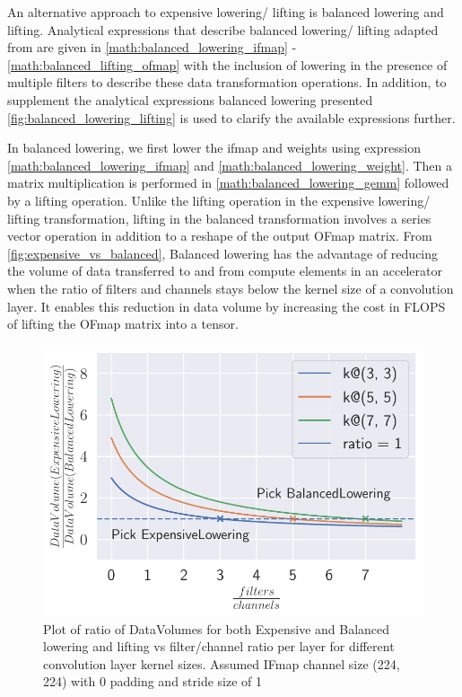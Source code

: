 An alternative approach to expensive lowering/ lifting is balanced lowering and
lifting. Analytical expressions that describe balanced lowering/ lifting adapted
from \cite{cafe_con_troll} are given in \eqref{math:balanced_lowering_ifmap} -
\eqref{math:balanced_lifting_ofmap} with the inclusion of lowering in the
presence of multiple filters to describe these data transformation operations.
In addition, to supplement the analytical expressions balanced lowering
presented \autoref{fig:balanced_lowering_lifting} is used to clarify the
available expressions further.  

In balanced lowering, we first lower the ifmap and weights using expression
\eqref{math:balanced_lowering_ifmap} and \eqref{math:balanced_lowering_weight}.
Then a matrix multiplication is performed in \eqref{math:balanced_lowering_gemm}
followed by a lifting operation. Unlike the lifting operation in the expensive
lowering/ lifting transformation, lifting in the balanced transformation
involves a series vector operation in addition to a reshape of the output OFmap
matrix. From \autoref{fig:expensive_vs_balanced}, Balanced lowering has the
advantage of reducing the volume of data transferred to and from compute
elements in an accelerator when the ratio of filters and channels stays below
the kernel size of a convolution layer. It enables this reduction in data volume
by increasing the cost in FLOPS of lifting the OFmap matrix into a tensor. 

\begin{figure}[!ht]
    \centering
    \includegraphics[scale=0.8]{Plots/kernel/BalancedVExpensive.pdf}
    \caption{Plot of ratio of DataVolumes for both Expensive and Balanced lowering and lifting vs filter/channel ratio per layer for different convolution layer kernel sizes. Assumed IFmap channel size (224, 224) with 0 padding and stride size of 1} 
    \label{fig:expensive_vs_balanced}
\end{figure}

